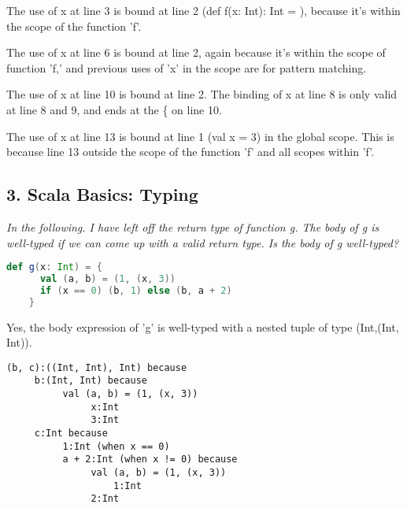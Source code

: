 \documentclass[a4paper, 10pt]{article}
\begin{document}
\begin{enumerate}[label=(\alph*)]
  \vspace{0.2in}

  \large{The use of x at line 3 is bound at line 2 (def f(x: Int): Int = ), because it's within the scope of the function 'f'.

  The use of x at line 6 is bound at line 2, again because it's within the scope of function 'f,' and previous uses of 'x' in the scope are for pattern matching.

  The use of x at line 10 is bound at line 2. The binding of x at line 8 is only valid at line 8 and 9, and ends at the \{ on line 10.

  The use of x at line 13 is bound at line 1 (val x = 3) in the global scope. This is because line 13 outside the scope of the function 'f' and all scopes within 'f'.}

  \vspace{0.2in}

\end{enumerate}

  \subsection*{3. Scala Basics: Typing}
  \textit{In the following. I have left off the return type of function g. The body of g is well-typed if we can come up with a valid return type. Is the body of g well-typed?}
  \begin{lstlisting}[language=Scala]
    def g(x: Int) = {
      val (a, b) = (1, (x, 3))
      if (x == 0) (b, 1) else (b, a + 2)
    }
  \end{lstlisting}

  \vspace{0.2in}
  Yes, the body expression of 'g' is well-typed with a nested tuple of type (Int,(Int, Int)).

\begin{verbatim}
(b, c):((Int, Int), Int) because
     b:(Int, Int) because
          val (a, b) = (1, (x, 3))
               x:Int
               3:Int
     c:Int because
          1:Int (when x == 0)
          a + 2:Int (when x != 0) because
               val (a, b) = (1, (x, 3))
                   1:Int
               2:Int
\end{verbatim}

  \vspace{0.2in}
\end{document}
